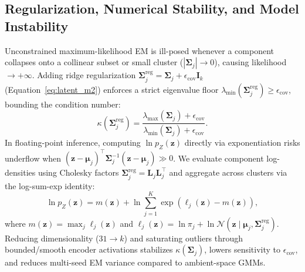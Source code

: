 \subsection{Regularization, Numerical Stability, and Model Instability}
\label{sec:p2_stability}
Unconstrained maximum-likelihood EM is ill-posed whenever a component collapses onto a collinear subset or small cluster ($|\boldsymbol{\Sigma}_j| \to 0$), causing likelihood $\to +\infty$. Adding ridge regularization $\boldsymbol{\Sigma}_j^{\text{reg}} = \boldsymbol{\Sigma}_j + \epsilon_{\text{cov}} \mathbf{I}_k$ (Equation~\ref{eq:latent_m2}) enforces a strict eigenvalue floor $\lambda_{\min}(\boldsymbol{\Sigma}_j^{\text{reg}}) \ge \epsilon_{\text{cov}}$, bounding the condition number:
\begin{equation}
    \kappa(\boldsymbol{\Sigma}_j^{\text{reg}}) = \frac{\lambda_{\max}(\boldsymbol{\Sigma}_j) + \epsilon_{\text{cov}}}{\lambda_{\min}(\boldsymbol{\Sigma}_j) + \epsilon_{\text{cov}}}.
    \label{eq:cond_number}
\end{equation}
In floating-point inference, computing $\ln p_Z(\mathbf{z})$ directly via exponentiation risks underflow when $(\mathbf{z}-\boldsymbol{\mu}_j)^\top \boldsymbol{\Sigma}_j^{-1} (\mathbf{z}-\boldsymbol{\mu}_j) \gg 0$. We evaluate component log-densities using Cholesky factors $\boldsymbol{\Sigma}_j^{\text{reg}} = \mathbf{L}_j \mathbf{L}_j^\top$ and aggregate across clusters via the log-sum-exp identity:
\begin{equation}
    \ln p_Z(\mathbf{z}) = m(\mathbf{z}) + \ln \sum_{j=1}^K \exp\!\left( \ell_j(\mathbf{z}) - m(\mathbf{z}) \right),
    \label{eq:logsumexp}
\end{equation}
where $m(\mathbf{z}) = \max_j \ell_j(\mathbf{z})$ and $\ell_j(\mathbf{z}) = \ln \pi_j + \ln \mathcal{N}(\mathbf{z} \mid \boldsymbol{\mu}_j, \boldsymbol{\Sigma}_j^{\text{reg}})$. Reducing dimensionality ($31 \to k$) and saturating outliers through bounded/smooth encoder activations stabilizes $\kappa(\boldsymbol{\Sigma}_j)$, lowers sensitivity to $\epsilon_{\text{cov}}$, and reduces multi-seed EM variance compared to ambient-space GMMs.

